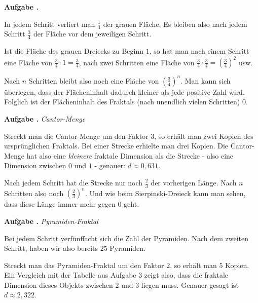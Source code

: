 \documentclass[a4paper,ngerman,12pt]{scrartcl}
\theoremstyle{definition}
\theoremstyle{plain}
\theoremstyle{remark}
\newlength{\aufgabenskip}
\newcounter{aufgabennummer}
\newenvironment{aufgabe}[1]{
  \addtocounter{aufgabennummer}{1}
  \textbf{Aufgabe \theaufgabennummer.} \emph{#1} \par
}{\vspace{\aufgabenskip}}
\begin{document}
\begin{aufgabe}{}
	In jedem Schritt verliert man $\frac{1}{4}$ der grauen Fläche. Es bleiben also nach jedem Schritt $\frac{3}{4}$ der Fläche vor dem jeweiligen Schritt.
	
	Ist die Fläche des grauen Dreiecks zu Beginn $1$, so hat man nach einem Schritt eine Fläche von $\frac{3}{4}\cdot 1 = \frac{3}{4}$, nach zwei Schritten eine Fläche von $\frac{3}{4} \cdot \frac{3}{4} = \left(\frac{3}{4}\right)^2$ usw.
	
	Nach $n$ Schritten bleibt also noch eine Fläche von $\left(\frac{3}{4}\right)^n$. Man kann sich überlegen, dass der Flächeninhalt dadurch kleiner als jede positive Zahl wird. Folglich ist der Flächeninhalt des Fraktals (\glqq nach unendlich vielen Schritten\grqq) $0$.
\end{aufgabe}


\begin{aufgabe}{Cantor-Menge}
	Streckt man die Cantor-Menge um den Faktor $3$, so erhält man zwei Kopien des ursprünglichen Fraktals. Bei einer Strecke erhielte man drei Kopien. Die Cantor-Menge hat also eine \emph{kleinere} fraktale Dimension als die Strecke - also eine Dimension zwischen $0$ und $1$ - genauer: $d \approx 0,631$.
	
	Nach jedem Schritt hat die Strecke nur noch $\frac{2}{3}$ der vorherigen Länge. Nach $n$ Schritten also noch $\left(\frac{2}{3}\right)^n$. Und wie beim Sierpinski-Dreieck kann man sehen, dass diese Länge immer mehr gegen $0$ geht.
\end{aufgabe}

\begin{aufgabe}{Pyramiden-Fraktal}
	Bei jedem Schritt verfünffacht sich die Zahl der Pyramiden. Nach dem zweiten Schritt, haben wir also bereits $25$ Pyramiden.
	
	Streckt man das Pyramiden-Fraktal um den Faktor $2$, so erhält man $5$ Kopien. Ein Vergleich mit der Tabelle aus Aufgabe 3 zeigt also, dass die fraktale Dimension dieses Objekts zwischen $2$ und $3$ liegen muss. Genauer gesagt ist $d \approx 2,322$.
\end{aufgabe}
	
\end{document}

